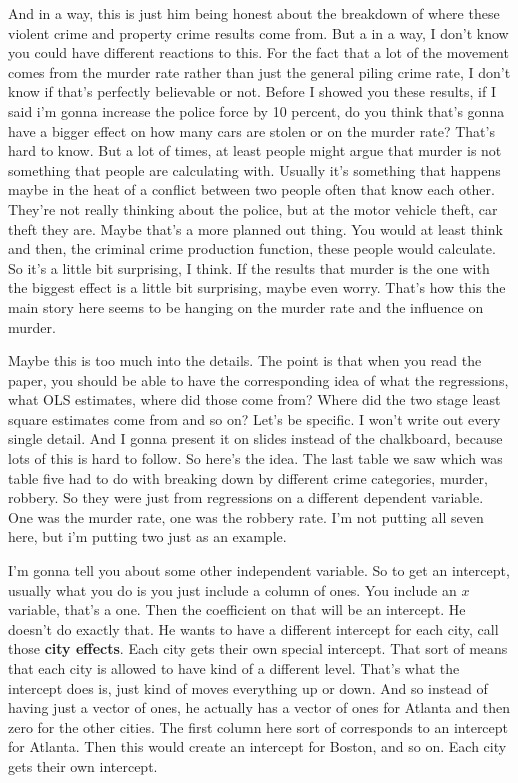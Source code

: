 \documentclass[11pt,a4paper]{amsart}
\theoremstyle{plain}
\theoremstyle{definition}
\begin{document}
			 And in a way, this is just him being honest about the breakdown of where these violent crime and property crime results come from.  But a in a way, I don't know you could have different reactions to this. For the fact that a lot of the movement comes from the murder rate rather than just the general piling crime rate,  I don't know if that's perfectly believable or not. Before I showed you these results, if I said i'm gonna increase the police force by 10 percent, do you think that's gonna have a bigger effect on how many cars are stolen or on the murder rate? That's hard to know. But a lot of times, at least people might argue that murder is not something that people are calculating with. Usually it's something that happens maybe in the heat of a conflict between two people often that know each other. They're not really thinking about the police, but at the motor vehicle theft, car theft they are. Maybe that's a more planned out thing. You would at least think and then, the criminal crime production function, these people would calculate. So it's a little bit surprising, I think. If the results that murder is the one with the biggest effect is a little bit surprising, maybe even worry. That's how this the main story here seems to be hanging on the murder rate and the influence on murder. \par 
			 Maybe this is too much into the details. The point is that when you read the paper, you should be able to have the corresponding idea of what the regressions, what OLS estimates, where did those come from? Where did the two stage least square estimates come from and so on? Let's be specific. I won't write out every single detail. And I  gonna present it on slides instead of the chalkboard, because lots of this is hard to follow. So here's the idea. The last table we saw which was table five had to do with breaking down by different crime categories, murder, robbery. So they were just from regressions on a different dependent variable. One was the murder rate, one was the robbery rate. I'm not putting all seven here, but i'm putting two just as an example. \par 
			I'm gonna tell you about some other independent variable. So to get an intercept, usually what you do is you just include a column of ones. You include an $x$ variable, that's a one. Then the coefficient on that will be an intercept.  He doesn't do exactly that. He wants to have a different intercept for each city, call those \textbf{city effects}. Each city gets their own special intercept. That sort of means that each city is allowed to have kind of a different level. That's what the intercept does is, just kind of moves everything up or down. And so instead of having just a vector of ones, he actually has a vector of ones for Atlanta and then zero for the other cities. The first column here sort of corresponds to an intercept for Atlanta. Then this would create an intercept for Boston, and so on. Each city gets their own intercept.\par
\end{document}
